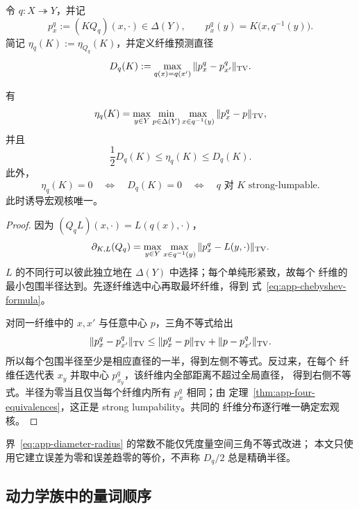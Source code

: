 令 $q:X\twoheadrightarrow Y$，并记
\[
  p_x^q:=(KQ_q)(x,\cdot)\in\Delta(Y),
  \qquad
  p_x^q(y)=K\bigl(x,q^{-1}(y)\bigr).
\]
简记 $\eta_q(K):=\eta_{Q_q}(K)$，并定义纤维预测直径
\begin{equation}
  D_q(K):=\max_{q(x)=q(x')}
  \|p_x^q-p_{x'}^q\|_{\operatorname{TV}}.
  \label{eq:app-fiber-diameter}
\end{equation}

\begin{theorem}[纤维 Chebyshev 中心]
\label{thm:app-chebyshev-center}
有
\begin{equation}
 \eta_q(K)
 =\max_{y\in Y}
   \min_{p\in\Delta(Y)}
   \max_{x\in q^{-1}(y)}\|p_x^q-p\|_{\operatorname{TV}},
 \label{eq:app-chebyshev-formula}
\end{equation}
并且
\begin{equation}
  \boxed{\frac12D_q(K)\le\eta_q(K)\le D_q(K).}
  \label{eq:app-diameter-radius}
\end{equation}
此外，
\begin{equation}
 \eta_q(K)=0
 \quad\Longleftrightarrow\quad
 D_q(K)=0
 \quad\Longleftrightarrow\quad
 q\text{ 对 }K\text{ strong-lumpable}.
 \label{eq:app-zero-approx-exact}
\end{equation}
此时诱导宏观核唯一。
\end{theorem}

\begin{proof}
因为 $(Q_qL)(x,\cdot)=L(q(x),\cdot)$，
\[
 \partial_{K,L}(Q_q)
 =\max_{y\in Y}\max_{x\in q^{-1}(y)}
   \|p_x^q-L(y,\cdot)\|_{\operatorname{TV}}.
\]
$L$ 的不同行可以彼此独立地在 $\Delta(Y)$ 中选择；每个单纯形紧致，故每个
纤维的最小包围半径达到。先逐纤维选中心再取最坏纤维，得到
式~\eqref{eq:app-chebyshev-formula}。

对同一纤维中的 $x,x'$ 与任意中心 $p$，三角不等式给出
\[
 \|p_x^q-p_{x'}^q\|_{\operatorname{TV}}
 \le\|p_x^q-p\|_{\operatorname{TV}}+\|p-p_{x'}^q\|_{\operatorname{TV}}.
\]
所以每个包围半径至少是相应直径的一半，得到左侧不等式。反过来，在每个
纤维任选代表 $x_y$ 并取中心 $p_{x_y}^q$，该纤维内全部距离不超过全局直径，
得到右侧不等式。半径为零当且仅当每个纤维内所有 $p_x^q$ 相同；由
定理~\ref{thm:app-four-equivalences}，这正是 strong lumpability。共同的
纤维分布逐行唯一确定宏观核。
\end{proof}

界~\eqref{eq:app-diameter-radius} 的常数不能仅凭度量空间三角不等式改进；
本文只使用它建立误差为零和误差趋零的等价，不声称 $D_q/2$ 总是精确半径。

\subsection{动力学族中的量词顺序}

